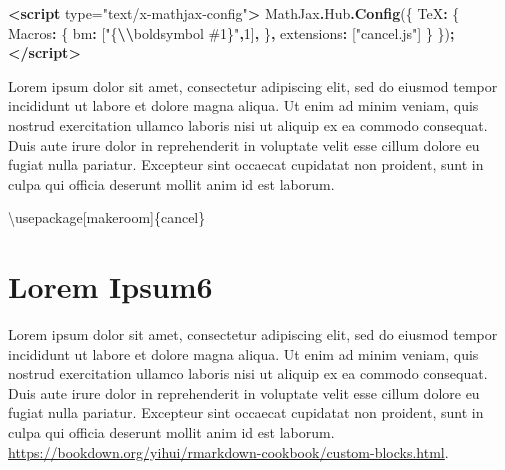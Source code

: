 \documentclass[
]{elegantbook}
\newenvironment{Shaded}{\begin{snugshade}}{\end{snugshade}}
\newcommand{\AttributeTok}[1]{\textcolor[rgb]{0.13,0.29,0.53}{#1}}
\newcommand{\BuiltInTok}[1]{#1}
\newcommand{\DataTypeTok}[1]{\textcolor[rgb]{0.13,0.29,0.53}{#1}}
\newcommand{\DecValTok}[1]{\textcolor[rgb]{0.00,0.00,0.81}{#1}}
\newcommand{\ExtensionTok}[1]{#1}
\newcommand{\FunctionTok}[1]{\textcolor[rgb]{0.13,0.29,0.53}{\textbf{#1}}}
\newcommand{\KeywordTok}[1]{\textcolor[rgb]{0.13,0.29,0.53}{\textbf{#1}}}
\newcommand{\NormalTok}[1]{#1}
\newcommand{\OperatorTok}[1]{\textcolor[rgb]{0.81,0.36,0.00}{\textbf{#1}}}
\newcommand{\OtherTok}[1]{\textcolor[rgb]{0.56,0.35,0.01}{#1}}
\newcommand{\SpecialCharTok}[1]{\textcolor[rgb]{0.81,0.36,0.00}{\textbf{#1}}}
\newcommand{\StringTok}[1]{\textcolor[rgb]{0.31,0.60,0.02}{#1}}
\begin{document}
\begin{Shaded}
\begin{Highlighting}[]
\KeywordTok{\textless{}script}\OtherTok{ type=}\StringTok{"text/x{-}mathjax{-}config"}\KeywordTok{\textgreater{}}
\NormalTok{    MathJax}\OperatorTok{.}\AttributeTok{Hub}\OperatorTok{.}\FunctionTok{Config}\NormalTok{(\{}
      \DataTypeTok{TeX}\OperatorTok{:}\NormalTok{ \{}
        \DataTypeTok{Macros}\OperatorTok{:}\NormalTok{ \{}
          \DataTypeTok{bm}\OperatorTok{:}\NormalTok{ [}\StringTok{"\{}\SpecialCharTok{\textbackslash{}\textbackslash{}}\StringTok{boldsymbol \#1\}"}\OperatorTok{,}\DecValTok{1}\NormalTok{]}\OperatorTok{,}
\NormalTok{        \}}\OperatorTok{,}
        \DataTypeTok{extensions}\OperatorTok{:}\NormalTok{ [}\StringTok{"cancel.js"}\NormalTok{]}
\NormalTok{      \}}
\NormalTok{    \})}\OperatorTok{;}
\KeywordTok{\textless{}/script\textgreater{}}
\end{Highlighting}
\end{Shaded}

Lorem ipsum dolor sit amet, consectetur adipiscing elit, sed do eiusmod tempor incididunt ut labore et dolore magna aliqua. Ut enim ad minim veniam, quis nostrud exercitation ullamco laboris nisi ut aliquip ex ea commodo consequat. Duis aute irure dolor in reprehenderit in voluptate velit esse cillum dolore eu fugiat nulla pariatur. Excepteur sint occaecat cupidatat non proident, sunt in culpa qui officia deserunt mollit anim id est laborum.

\begin{Shaded}
\begin{Highlighting}[]
\BuiltInTok{\textbackslash{}usepackage}\NormalTok{[makeroom]\{}\ExtensionTok{cancel}\NormalTok{\}}
\end{Highlighting}
\end{Shaded}

\hypertarget{custom-block}{%
\section{Lorem Ipsum6}\label{custom-block}}

Lorem ipsum dolor sit amet, consectetur adipiscing elit, sed do eiusmod tempor incididunt ut labore et dolore magna aliqua. Ut enim ad minim veniam, quis nostrud exercitation ullamco laboris nisi ut aliquip ex ea commodo consequat. Duis aute irure dolor in reprehenderit in voluptate velit esse cillum dolore eu fugiat nulla pariatur. Excepteur sint occaecat cupidatat non proident, sunt in culpa qui officia deserunt mollit anim id est laborum. \url{https://bookdown.org/yihui/rmarkdown-cookbook/custom-blocks.html}.
\end{document}
